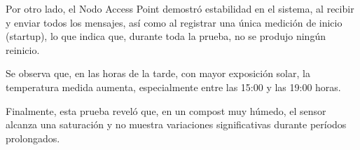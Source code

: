 Por otro lado, el Nodo Access Point demostró estabilidad en el sistema, al recibir y enviar todos los mensajes, así como al registrar una única medición de inicio (startup), lo que indica que, durante toda la prueba, no se produjo ningún reinicio.

Se observa que, en las horas de la tarde, con mayor exposición solar, la temperatura medida aumenta, especialmente entre las 15:00 y las 19:00 horas.

Finalmente, esta prueba reveló que, en un compost muy húmedo, el sensor alcanza una saturación y no muestra variaciones significativas durante períodos prolongados.
